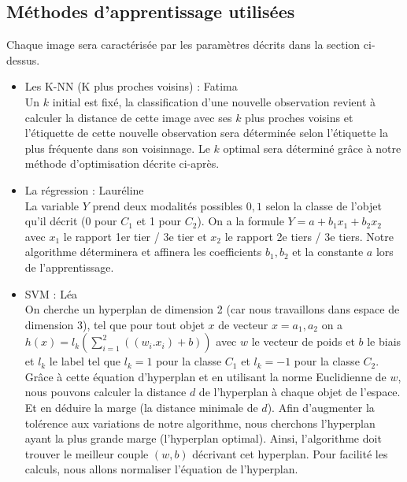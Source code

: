 \documentclass[a4paper,10pt]{article}
\begin{document}
	\subsection{Méthodes d'apprentissage utilisées}
		Chaque image sera caractérisée par les paramètres décrits dans la section ci- dessus. 
		\begin{itemize}
			\item Les K-NN (K plus proches voisins) : Fatima\\
			Un $k$ initial est fixé, la classification d'une nouvelle observation revient à calculer la distance de cette image avec ses $k$ plus proches voisins et l'étiquette de cette nouvelle observation sera déterminée selon l'étiquette la plus fréquente dans son voisinnage. Le $k$ optimal sera déterminé grâce à notre méthode d'optimisation décrite ci-après.\\

			\item La régression : Lauréline\\
			La variable $Y$ prend deux modalités possibles ${0, 1}$ selon la classe de l'objet qu'il décrit (0 pour $C_1$ et 1 pour $C_2$). On a la formule $Y = a + b_1 x_1+ b_2 x_2$ avec $x_1$ le rapport 1er tier / 3e tier et $x_2$ le rapport 2e tiers / 3e tiers. Notre algorithme déterminera et affinera les coefficients $b_1, b_2$ et la constante $a$ lors de l'apprentissage.
			\item SVM : Léa\\
			On cherche un hyperplan de dimension 2 (car nous travaillons dans espace de dimension 3), tel que pour tout objet $x$ de vecteur $x = {a_1, a_2} $ on a $h(x) = l_k (\sum_{i = 1} ^2 ((w_i . x_i ) + b ) )$ avec $w$ le vecteur de poids et $b$ le biais et $l_k$ le label tel que $l_k = 1 $ pour la classe $C_1$ et $l_k = -1$ pour la classe $C_2$. Grâce à cette équation d'hyperplan et en utilisant la norme Euclidienne de $w$, nous pouvons calculer la distance $d$ de l'hyperplan à chaque objet de l'espace. Et en déduire la marge (la distance minimale de $d$). Afin d'augmenter la tolérence aux variations de notre algorithme, nous cherchons l'hyperplan ayant la plus grande marge (l'hyperplan optimal). Ainsi, l'algorithme doit trouver le meilleur couple $(w, b)$ décrivant cet hyperplan. Pour facilité les calculs, nous allons normaliser l'équation de l'hyperplan.
		\end{itemize}
\end{document}
